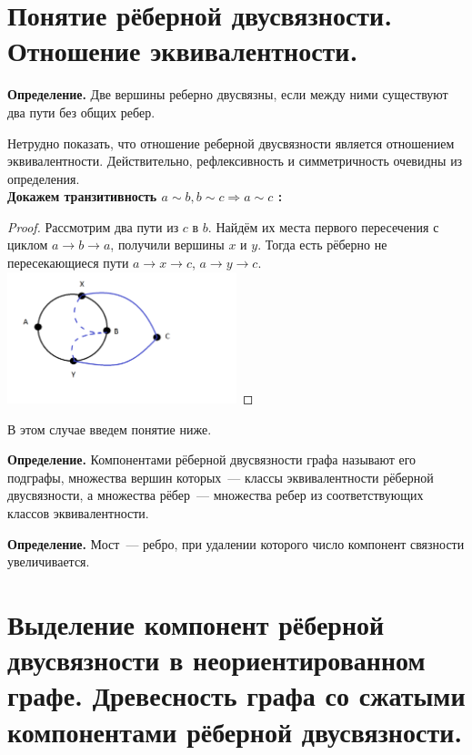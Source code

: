  
\newpage
\setcounter{section}{37}
\section{Понятие рёберной двусвязности. Отношение эквивалентности.}

\textbf{Определение.} Две вершины реберно двусвязны, если между ними существуют два пути без общих ребер.
   
Нетрудно показать, что отношение реберной двусвязности является отношением эквивалентности. Действительно, рефлексивность и симметричность очевидны из определения.\\
\textbf{Докажем транзитивность $a \sim b, b \sim c \Rightarrow a \sim c$ :}

\begin{proof}
Рассмотрим два пути из $c$ в $b$. Найдём их места первого пересечения с циклом $a \to b \to a$, получили вершины $x$ и $y$. 
Тогда есть рёберно не пересекающиеся пути $a \to x \to c$, $a \to y \to c$. \\

\includegraphics[width=0.5\textwidth]{images/38_1.png}
\end{proof}

В этом случае введем понятие ниже.
        
\textbf{Определение.} Компонентами рёберной двусвязности графа называют его подграфы, множества вершин которых~---  классы эквивалентности рёберной двусвязности, а множества рёбер~--- множества ребер из соответствующих классов эквивалентности.
        
\textbf{Определение.} Мост~--- ребро, при удалении которого число компонент связности увеличивается.

\setcounter{section}{38}
\section{Выделение компонент рёберной двусвязности в неориентированном графе. Древесность графа со сжатыми компонентами рёберной двусвязности.}

